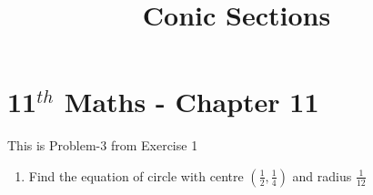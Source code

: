 \documentclass[12pt]{article}
\begin{document}
\begin{center}
\enlargethispage{-4cm}
\title{\textbf{Conic Sections}}
\date{\vspace{-5ex}} %
\maketitle
\end{center}
\setcounter{page}{1}
\section*{11$^{th}$ Maths - Chapter 11}
This is Problem-3 from Exercise 1
\begin{enumerate}
	\item Find the equation of circle with centre $(\frac{1}{2},\frac{1}{4})$ and radius $\frac{1}{12}$


\end{enumerate}
\end{document}

